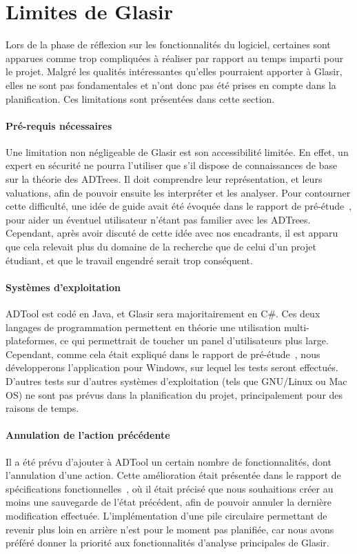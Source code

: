 \section{Limites de Glasir}
    \label{sec:limites}

    Lors de la phase de réflexion sur les fonctionnalités du logiciel, certaines sont apparues comme trop compliquées à réaliser par rapport au temps imparti pour le projet. Malgré les qualités intéressantes qu'elles pourraient apporter à Glasir, elles ne sont pas fondamentales et n'ont donc pas été prises en compte dans la planification. Ces limitations sont présentées dans cette section.

    \paragraph{Pré-requis nécessaires}

    Une limitation non négligeable de Glasir est son accessibilité limitée. En effet, un expert en sécurité ne pourra l'utiliser que s'il dispose de connaissances de base sur la théorie des ADTrees. Il doit comprendre leur représentation, et leurs valuations, afin de pouvoir ensuite les interpréter et les analyser. Pour contourner cette difficulté, une idée de \og guide \fg{} avait été évoquée dans le rapport de pré-étude~\cite{pre_etude}, pour aider un éventuel utilisateur n'étant pas familier avec les ADTrees. Cependant, après avoir discuté de cette idée avec nos encadrants, il est apparu que cela relevait plus du domaine de la recherche que de celui d'un projet étudiant, et que le travail engendré serait trop conséquent.

    \paragraph{Systèmes d'exploitation}

    ADTool est codé en Java, et Glasir sera majoritairement en C\#. Ces deux langages de programmation permettent en théorie une utilisation multi-plateformes, ce qui permettrait de toucher un panel d'utilisateurs plus large. Cependant, comme cela était expliqué dans le rapport de pré-étude~\cite{pre_etude}, nous développerons l'application pour Windows, sur lequel les tests seront effectués. D'autres tests sur d'autres systèmes d'exploitation (tels que GNU/Linux ou Mac OS) ne sont pas prévus dans la planification du projet, principalement pour des raisons de temps.

    \paragraph{Annulation de l'action précédente}

    Il a été prévu d'ajouter à ADTool un certain nombre de fonctionnalités, dont l'annulation d'une action. Cette amélioration était présentée dans le rapport de spécifications fonctionnelles~\cite{spec_fonc}, où il était précisé que nous souhaitions créer au moins une sauvegarde de l'état précédent, afin de pouvoir annuler la dernière modification effectuée. L'implémentation d'une pile circulaire permettant de revenir plus loin en arrière n'est pour le moment pas planifiée, car nous avons préféré donner la priorité aux fonctionnalités d'analyse principales de Glasir.